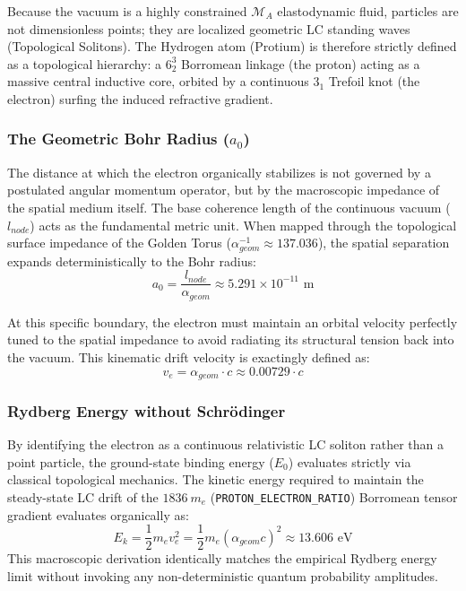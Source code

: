 Because the vacuum is a highly constrained $\mathcal{M}_A$ elastodynamic fluid, particles are not dimensionless points; they are localized geometric LC standing waves (Topological Solitons). The Hydrogen atom (Protium) is therefore strictly defined as a topological hierarchy: a $6^3_2$ Borromean linkage (the proton) acting as a massive central inductive core, orbited by a continuous $3_1$ Trefoil knot (the electron) surfing the induced refractive gradient.

\subsubsection{The Geometric Bohr Radius ($a_0$)}
The distance at which the electron organically stabilizes is not governed by a postulated angular momentum operator, but by the macroscopic impedance of the spatial medium itself. The base coherence length of the continuous vacuum ($l_{node}$) acts as the fundamental metric unit. When mapped through the topological surface impedance of the Golden Torus ($\alpha_{geom}^{-1} \approx 137.036$), the spatial separation expands deterministically to the Bohr radius:
\begin{equation}
a_0 = \frac{l_{node}}{\alpha_{geom}} \approx 5.291 \times 10^{-11} \text{ m}
\end{equation}

At this specific boundary, the electron must maintain an orbital velocity perfectly tuned to the spatial impedance to avoid radiating its structural tension back into the vacuum. This kinematic drift velocity is exactingly defined as:
\begin{equation}
v_e = \alpha_{geom} \cdot c \approx 0.00729 \cdot c
\end{equation}

\subsubsection{Rydberg Energy without Schrödinger}
By identifying the electron as a continuous relativistic LC soliton rather than a point particle, the ground-state binding energy ($E_0$) evaluates strictly via classical topological mechanics. The kinetic energy required to maintain the steady-state LC drift of the $1836 \: m_e$ (\texttt{PROTON\_ELECTRON\_RATIO}) Borromean tensor gradient evaluates organically as:
\begin{equation}
E_k = \frac{1}{2} m_e v_e^2 = \frac{1}{2} m_e (\alpha_{geom} c)^2 \approx 13.606 \text{ eV}
\end{equation}
This macroscopic derivation identically matches the empirical Rydberg energy limit without invoking any non-deterministic quantum probability amplitudes. 




